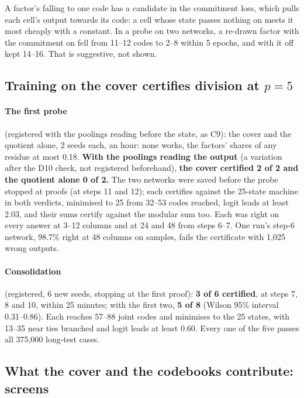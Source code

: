 \documentclass[11pt]{article}
\begin{document}
A factor's falling to one code has a candidate in the commitment loss, which pulls each cell's
output towards its code: a cell whose state passes nothing on meets it most cheaply with a constant. In a probe on two
networks, a re-drawn factor with the commitment on fell from 11--12 codes to 2--8 within 5 epochs,
and with it off kept 14--16. That is suggestive, not shown.

\subsection{\texorpdfstring{Training on the cover certifies division at $p = 5$}{Training on the cover certifies division at p = 5}}

\paragraph{The first probe} (registered with the poolings reading before the state, as C9): the
cover and the quotient alone, 2 seeds each, an hour: none works, the factors' shares of any
residue at most 0.18. \textbf{With the poolings reading the output} (a variation after the D10
check, not registered beforehand), \textbf{the cover certified 2 of 2 and the quotient alone 0
of 2.} The two networks were saved before the probe stopped at proofs (at steps 11 and 12); each
certifies against the 25-state machine in both verdicts, minimised to 25 from 32--53 codes reached,
logit leads at least 2.03, and their sums certify against the modular sum too. Each was right on
every answer at 3--12 columns and at 24 and 48 from steps 6--7. One run's step-6 network, 98.7\%
right at 48 columns on samples, fails the certificate with 1{,}025 wrong outputs.

\paragraph{Consolidation} (registered, 6 new seeds, stopping at the first proof): \textbf{3 of 6
certified}, at steps 7, 8 and 10, within 25 minutes; with the first two, \textbf{5 of 8} (Wilson
95\% interval 0.31--0.86). Each reaches 57--88 joint codes and minimises to the 25 states, with
13--35 near ties branched and logit leads at least 0.60. Every one of the five passes all 375{,}000
long-test cases.

\subsection{What the cover and the codebooks contribute: screens}
\label{sec:isolate}
\end{document}
